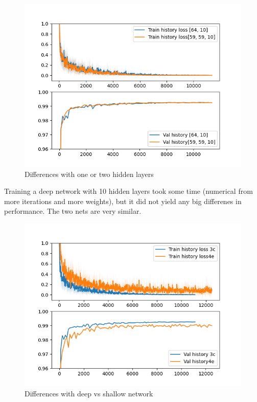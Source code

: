 \documentclass[a4paper]{article}
\begin{document}
\begin{figure}[h]
    \includegraphics[width=\linewidth]{code/one_vs_two_hidden_layers.png}
    \caption{Differences with one or two hidden layers}
\end{figure}

\clearpage
Training a deep network with 10 hidden layers took some time (numerical from more iterations and more weights), but it did not yield any big differenes in performance. The two nets are very similar.

\begin{figure}[h]
    \includegraphics[width=\linewidth]{code/deeeeep_network.png}
    \caption{Differences with deep vs shallow network}
\end{figure}
\end{document}
